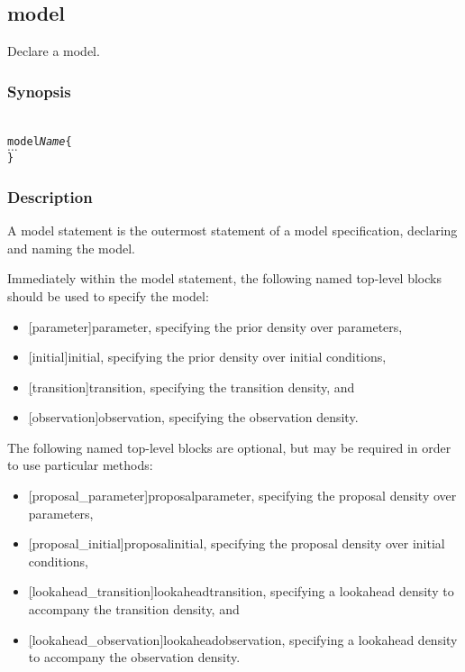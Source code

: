 \subsection{{\sf model}\label{model}}

Declare a model.

\subsubsection*{Synopsis\label{model_Synopsis}}
\begin{alltt}{\sf
    model \textsl{Name} \{
      \(\ldots\)
    \}
}\end{alltt}


\subsubsection*{Description\label{model_Description}}

A \textsf{model} statement is the outermost statement of a model specification,
declaring and naming the model.

Immediately within the \textsf{model} statement, the following named top-level blocks should
be used to specify the model:
\begin{itemize}
\item \textsf{\hyperref[hyper][parameter]{parameter}}, specifying the prior density over parameters,
\item \textsf{\hyperref[hyper][initial]{initial}}, specifying the prior density over initial conditions,
\item \textsf{\hyperref[hyper][transition]{transition}}, specifying the transition density, and
\item \textsf{\hyperref[hyper][observation]{observation}}, specifying the observation density.
\end{itemize}

The following named top-level blocks are optional, but may be required in order to use particular methods:
\begin{itemize}
\item \textsf{\hyperref[hyper][proposal_parameter]{proposal\textunderscore{}parameter}}, specifying the proposal density over parameters,
\item \textsf{\hyperref[hyper][proposal_initial]{proposal\textunderscore{}initial}}, specifying the proposal density over initial conditions,
\item \textsf{\hyperref[hyper][lookahead_transition]{lookahead\textunderscore{}transition}}, specifying a lookahead density to accompany the transition density, and
\item \textsf{\hyperref[hyper][lookahead_observation]{lookahead\textunderscore{}observation}}, specifying a lookahead density to accompany the observation density.
\end{itemize}

